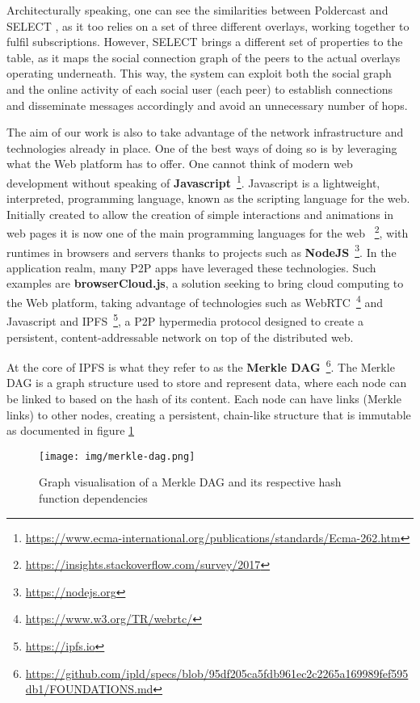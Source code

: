Architecturally speaking, one can see the similarities between Poldercast and
SELECT \cite{Apolonia2018}, as it too relies on a set of three different
overlays, working together to fulfil subscriptions. However, SELECT brings a
different set of properties to the table, as it maps the social connection
graph of the peers to the actual overlays operating underneath. This way, the
system can exploit both the social graph and the online activity of each social
user (each peer) to establish connections and disseminate messages accordingly
and avoid an unnecessary number of hops.

The aim of our work is also to take advantage of the network infrastructure and
technologies already in place. One of the best ways of doing so is by
leveraging what the Web platform has to offer. One cannot think of modern web
development without speaking of
\textbf{Javascript}~\footnote{\url{https://www.ecma-international.org/publications/standards/Ecma-262.htm}}.
Javascript is a lightweight, interpreted, programming language, known as the
scripting language for the web. Initially created to allow the creation of
simple interactions and animations in web pages it is now one of the main
programming languages for the web
~\footnote{\url{https://insights.stackoverflow.com/survey/2017}}, with runtimes
in browsers and servers thanks to projects such as
\textbf{NodeJS}~\footnote{\url{https://nodejs.org}}. In the application realm,
many P2P apps have leveraged these technologies. Such examples are
\textbf{browserCloud.js}\cite{Dias2018}, a solution seeking to bring cloud
computing to the Web platform, taking advantage of technologies such as
WebRTC~\footnote{\url{https://www.w3.org/TR/webrtc/}} and Javascript and
IPFS~\footnote{\url{https://ipfs.io}}, a P2P hypermedia protocol designed to
create a persistent, content-addressable network on top of the distributed web.

At the core of IPFS is what they refer to as the \textbf{Merkle
DAG}~\footnote{\url{https://github.com/ipld/specs/blob/95df205ca5fdb961ec2c2265a169989fef595db1/FOUNDATIONS.md}}.
The Merkle DAG is a graph structure used to store and represent data, where
each node can be linked to based on the hash of its content. Each node can have
links (Merkle links) to other nodes, creating a persistent, chain-like
structure that is immutable as documented in figure \ref{fig:merkle-dag}

\begin{figure}[hb!]
  \centering
  \texttt{[image: img/merkle-dag.png]}
  \caption{Graph visualisation of a Merkle DAG and its respective hash function dependencies}
  \label{fig:merkle-dag}
\end{figure}

